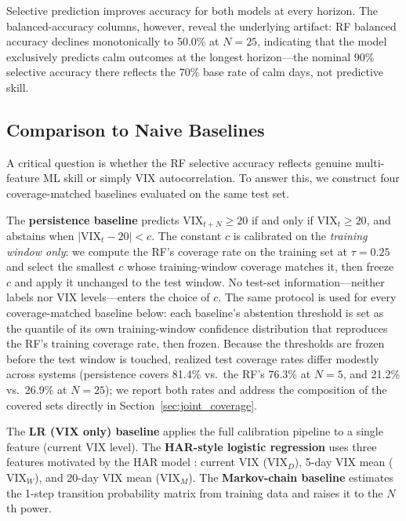 \documentclass[12pt]{article}
\begin{document}
Selective prediction improves accuracy for both models at every horizon. The balanced-accuracy
columns, however, reveal the underlying artifact: RF balanced accuracy declines monotonically
to 50.0\% at $N = 25$, indicating that the model exclusively predicts calm outcomes at the
longest horizon---the nominal 90\% selective accuracy there reflects the 70\% base rate of
calm days, not predictive skill.

\subsection{Comparison to Naive Baselines}
\label{sec:baselines}

A critical question is whether the RF selective accuracy reflects genuine multi-feature ML skill
or simply VIX autocorrelation. To answer this, we construct four coverage-matched baselines
evaluated on the same test set.

The \textbf{persistence baseline} predicts $\text{VIX}_{t+N} \geq 20$ if and only if
$\text{VIX}_t \geq 20$, and abstains when $|\text{VIX}_t - 20| < c$. The constant $c$ is
calibrated on the \emph{training window only}: we compute the RF's coverage rate on the
training set at $\tau = 0.25$ and select the smallest $c$ whose training-window coverage
matches it, then freeze $c$ and apply it unchanged to the test window. No test-set
information---neither labels nor VIX levels---enters the choice of $c$. The same protocol is
used for every coverage-matched baseline below: each baseline's abstention threshold is set as
the quantile of its own training-window confidence distribution that reproduces the RF's
training coverage rate, then frozen. Because the thresholds are frozen before the test window
is touched, realized test coverage rates differ modestly across systems (persistence covers
81.4\% vs.\ the RF's 76.3\% at $N = 5$, and 21.2\% vs.\ 26.9\% at $N = 25$); we report both
rates and address the composition of the covered sets directly in
Section~\ref{sec:joint_coverage}.

The \textbf{LR (VIX only) baseline} applies the full calibration
pipeline to a single feature (current VIX level). The \textbf{HAR-style logistic regression}
uses three features motivated by the HAR model \citep{corsi2009}: current VIX ($\text{VIX}_D$),
5-day VIX mean ($\text{VIX}_W$), and 20-day VIX mean ($\text{VIX}_M$). The
\textbf{Markov-chain baseline} estimates the 1-step transition probability matrix from training
data and raises it to the $N$th power.
\end{document}
